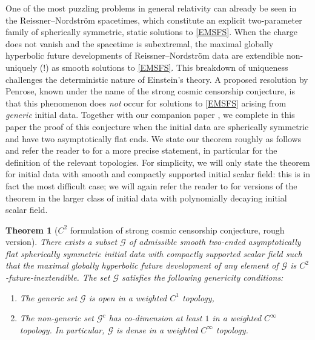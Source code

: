 \documentclass[10pt, reqno]{amsart}
\newtheorem{theorem}{Theorem}[section]
\theoremstyle{definition}
\theoremstyle{remark}
\newtheorem{remark}[theorem]{Remark}
\theoremstyle{conjecture}
\numberwithin{equation}{section}
\newcommand{\0}{\emptyset}
\begin{document}
One of the most puzzling problems in general relativity can already be seen in the Reissner--Nordstr\"om spacetimes, which constitute an explicit two-parameter family of spherically symmetric, static solutions to \eqref{EMSFS}. When the charge does not vanish and the spacetime is subextremal, the maximal globally hyperbolic future developments of Reissner--Nordstr\"om data are extendible non-uniquely (!) as smooth solutions to \eqref{EMSFS}. This breakdown of uniqueness challenges the deterministic nature of Einstein's theory. A proposed resolution by Penrose, known under the name of the strong cosmic censorship conjecture, is that this phenomenon does \emph{not} occur for solutions to \eqref{EMSFS} arising from \emph{generic} initial data. Together with our companion paper \cite{LO.interior}, we complete in this paper the proof of this conjecture when the initial data are spherically symmetric and have two asymptotically flat ends. We state our theorem roughly as follows and refer the reader to \cite{LO.interior} for a more precise statement, in particular for the definition of the relevant topologies. For simplicity, we will only state the theorem for initial data with smooth and compactly supported initial scalar field: this is in fact the most difficult case; we will again refer the reader to \cite{LO.interior} for versions of the theorem in the larger class of initial data with polynomially decaying initial scalar field.
\begin{theorem}[$C^2$ formulation of strong cosmic censorship conjecture, rough version]\label{main.theorem.intro}
There exists a subset $\mathcal G$ of admissible smooth two-ended asymptotically flat spherically symmetric initial data with compactly supported scalar field such that the maximal globally hyperbolic future development of any element of $\mathcal G$ is $C^2$-future-inextendible. The set $\mathcal G$ satisfies the following genericity conditions:
\begin{enumerate}
\item The generic set $\mathcal G$ is open in a weighted $C^1$ topology,
\item The non-generic set $\mathcal G^c$ has co-dimension at least $1$ in a weighted $C^\infty$ topology. In particular, $\mathcal G$ is dense in a weighted $C^\infty$ topology.
\end{enumerate}
\end{theorem}

\end{document}
